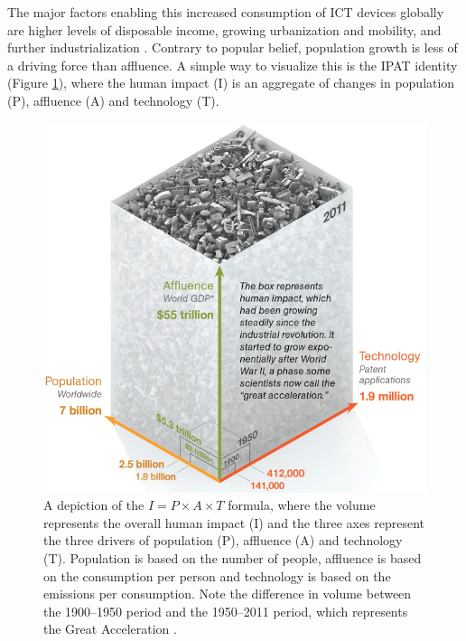 \documentclass{article}
\begin{document}
The major factors enabling this increased consumption of ICT devices globally are higher levels of disposable income, growing urbanization and mobility, and further industrialization \cite{forti2020global}. Contrary to popular belief, population growth is less of a driving force than affluence. A simple way to visualize this is the IPAT identity (Figure \ref{human_impact_PAT}), where the human impact (I) is an aggregate of changes in population (P), affluence (A) and technology (T).

\begin{figure}[h]
    \includegraphics[width=.6 \textwidth]{./images/I=PAT_crop.png}
    \centering
    \caption{A depiction of the $I = P \times A \times T$ formula, where the volume represents the overall human impact (I) and the three axes represent the three drivers of population (P), affluence (A) and technology (T). Population is based on the number of people, affluence is based on the consumption per person and technology is based on the emissions per consumption. Note the difference in volume between the 1900–1950 period and the 1950–2011 period, which represents the Great Acceleration \cite{steffen2011anthropocene, nationalgeographic2014IPAT}.}
    \label{human_impact_PAT}
\end{figure}

\cleardoublepage
\end{document}
